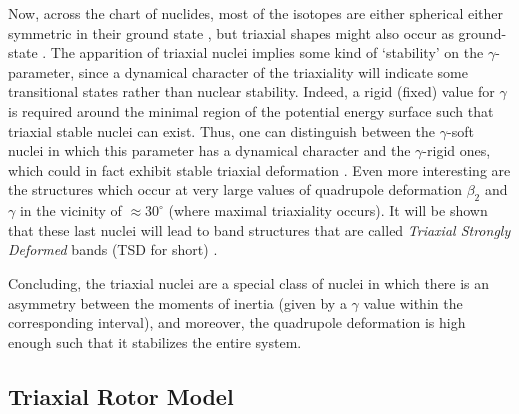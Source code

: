 Now, across the chart of nuclides, most of the isotopes are either spherical either symmetric in their ground state \cite{budaca2018tilted}, but triaxial shapes might also occur as ground-state \cite{moller2006global}. The apparition of triaxial nuclei implies some kind of `stability' on the $\gamma$-parameter, since a dynamical character of the triaxiality will indicate some transitional states rather than nuclear stability. Indeed, a rigid (fixed) value for $\gamma$ is required around the minimal region of the potential energy surface such that triaxial stable nuclei can exist. Thus, one can distinguish between the $\gamma$-soft nuclei in which this parameter has a dynamical character and the $\gamma$-rigid ones, which could in fact exhibit stable triaxial deformation \cite{dracoulis2013isomers}.
Even more interesting are the structures which occur at very large values of quadrupole deformation $\beta_2$ and $\gamma$ in the vicinity of $\approx 30^\circ$ (where maximal triaxiality occurs). It will be shown that these last nuclei will lead to band structures that are called \emph{Triaxial Strongly Deformed} bands (TSD for short) \cite{odegaard2001evidence,jensen2002evidence}.

Concluding, the triaxial nuclei are a special class of nuclei in which there is an asymmetry between the moments of inertia (given by a $\gamma$ value within the corresponding interval), and moreover, the quadrupole deformation is high enough such that it stabilizes the entire system.

\subsection{Triaxial Rotor Model}
\label{trm-model}


